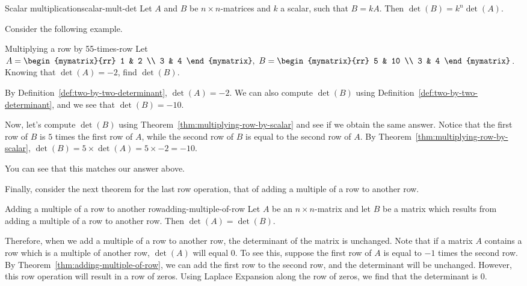\begin{theorem}{Scalar multiplication}{scalar-mult-det}
  Let $A$ and $B$ be $n \times n$-matrices and $k$ a scalar, such that
  $B = kA$. Then $\det(B) = k^n \det(A)$.
\end{theorem}

Consider the following example.

\begin{example}{Multiplying a row by 5}{5-times-row}
  Let $A=\begin{mymatrix}{rr}
    1 & 2 \\
    3 & 4
  \end{mymatrix} ,\ B=\begin{mymatrix}{rr}
    5 & 10 \\
    3 & 4
  \end{mymatrix}$.
  Knowing that $\det(A) =-2$, find  $\det(B)$.
\end{example}

\begin{solution}
  By Definition~\ref{def:two-by-two-determinant}, $\det(A) =-2$. We
  can also compute $\det(B)$ using
  Definition~\ref{def:two-by-two-determinant}, and we see that
  $\det(B) = -10$.

  Now, let's compute $\det(B)$ using
  Theorem~\ref{thm:multiplying-row-by-scalar} and see if we obtain the
  same answer. Notice that the first row of $B$ is $5$ times the first
  row of $A$, while the second row of $B$ is equal to the second row
  of $A$.  By Theorem~\ref{thm:multiplying-row-by-scalar},
  $\det(B) = 5 \times \det(A) = 5 \times -2 = -10$.

  You can see that this matches our answer above.
\end{solution}

Finally, consider the next theorem for the last row operation, that of
adding a multiple of a row to another row.

\begin{theorem}{Adding a multiple of a row to another row}{adding-multiple-of-row}
  Let $A$ be an $n\times n$-matrix and let $B$ be a matrix which
  results from adding a multiple of a row to another row.  Then
  $\det(A) =\det(B)$.
\end{theorem}

Therefore, when we add a multiple of a row to another row, the
determinant of the matrix is unchanged.  Note that if a matrix $A$
contains a row which is a multiple of another row, $\det(A)$ will
equal $0$. To see this, suppose the first row of $A$ is equal to $-1$
times the second row. By Theorem~\ref{thm:adding-multiple-of-row}, we
can add the first row to the second row, and the determinant will be
unchanged. However, this row operation will result in a row of zeros.
Using Laplace Expansion along the row of zeros, we find that the
determinant is $0$.

